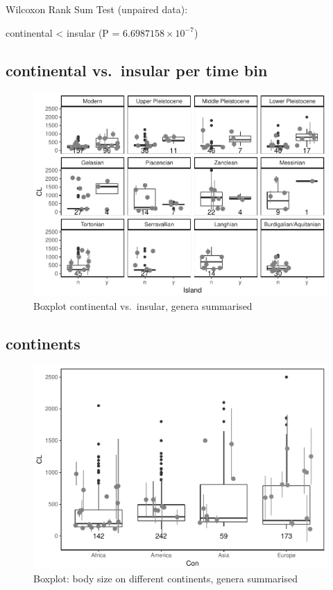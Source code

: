\documentclass[]{article}
\begin{document}
Wilcoxon Rank Sum Test (unpaired data):

continental \textless{} insular (P = \(6.6987158\times 10^{-7}\))

\newpage

\subsection{continental vs.~insular per time
bin}\label{continental-vs.insular-per-time-bin-1}

\begin{figure}[htbp]
\centering
\includegraphics{MA_JJ_files/figure-latex/BPCIBins-1.pdf}
\caption{Boxplot continental vs.~insular, genera summarised}
\end{figure}

\newpage

\subsection{continents}\label{continents-1}

\begin{figure}[htbp]
\centering
\includegraphics{MA_JJ_files/figure-latex/BPCon-1.pdf}
\caption{Boxplot: body size on different continents, genera summarised}
\end{figure}
\end{document}
